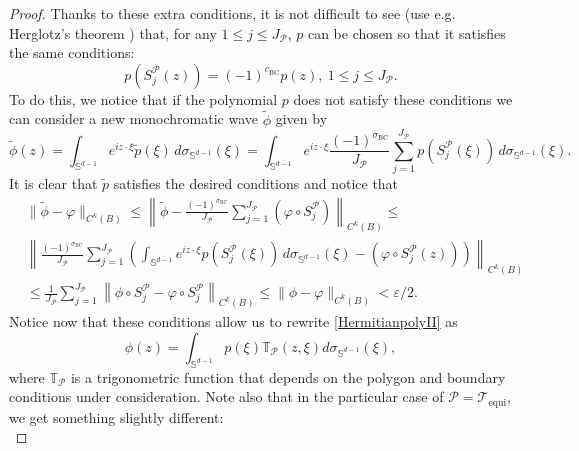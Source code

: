 \documentclass{amsart}
\theoremstyle{definition}
\theoremstyle{remark}
\newcommand{\ep}{\varepsilon}
\newcommand{\si}{\sigma}
\renewcommand\leq\leqslant
\numberwithin{equation}{section}
\theoremstyle{definition}
\theoremstyle{remark}
\begin{document}
\begin{proof}
	Thanks to these extra conditions, it is not difficult to see (use e.g. Herglotz's theorem \cite[Theorem 7.1.27]{Hor}) that, for any $1\leq j\leq J_\mathcal{P}$, $p$ can be chosen so that it satisfies the same conditions:\begin{equation}
		p\left(S^{\mathcal{P}}_j\left(z\right)\right)=\left(-1\right)^{c_\mathrm{BC}}p(z),\ 1\leq j\leq J_\mathcal{P}.
	\end{equation}To do this, we notice that if the polynomial $p$ does not satisfy these conditions we can consider a new monochromatic wave $\tilde{\phi}$ given by\begin{equation}
\tilde{	\phi}(z)=\int_{\mathbb{S}^{d-1}} e^{i z\cdot\xi} \tilde{p}(\xi) \, d\si_{\mathbb{S}^{d-1}}(\xi)=\int_{\mathbb{S}^{d-1}} e^{i z\cdot\xi} \frac{\left(-1\right)^{\sigma_{\mathrm{BC}}}}{J_\mathcal{P}}\sum_{j=1}^{J_\mathcal{P}}p\left(S^\mathcal{P}_j\left(\xi\right)\right) \, d\si_{\mathbb{S}^{d-1}}(\xi).
	\end{equation}It is clear that $\tilde{p}$ satisfies the desired conditions and notice that
	\begin{equation}
	\begin{aligned}
	&\|\tilde{\phi}-\varphi\|_{C^k(B)}\leq\left\|\tilde{\phi}-\frac{\left(-1\right)^{\sigma_{\mathrm{BC}}}}{J_\mathcal{P}}\sum_{j=1}^{J_\mathcal{P}}\left(\varphi\circ S^\mathcal{P}_j\right)\right\|_{C^k(B)}\leq\\&\left\|\frac{\left(-1\right)^{\sigma_{\mathrm{BC}}}}{J_\mathcal{P}}\sum_{j=1}^{J_\mathcal{P}}\left(\int_{\mathbb{S}^{d-1}} e^{i z\cdot\xi} p\left(S^\mathcal{P}_j\left(\xi\right)\right) \, d\si_{\mathbb{S}^{d-1}}(\xi)-\left(\varphi\circ S^\mathcal{P}_j(z)\right)\right)\right\|_{C^k(B)}\\&\leq \frac{1}{J_\mathcal{P}}\sum_{j=1}^{J_\mathcal{P}}\left\|\phi\circ S^\mathcal{P}_j-\varphi\circ S^\mathcal{P}_j\right\|_{C^k(B)}\leq\|\phi-\varphi\|_{C^k(B)}<\ep/2.
	\end{aligned}
	\end{equation}
	Notice now that these conditions allow us to rewrite \eqref{HermitianpolyII} as
	\begin{equation}
		\phi(z)=\int_{\mathbb{S}^{d-1}}p(\xi)\mathbb{T}_\mathcal{P}(z,\xi)d\si_{\mathbb{S}^{d-1}}(\xi),
	\end{equation}where $\mathbb{T}_\mathcal{P}$ is a trigonometric function that depends on the polygon and boundary conditions under consideration. Note also that in the particular case of $\mathcal{P}=	\mathcal{T}_\mathrm{equi}$, we get something slightly different:\begin{equation}

\end{equation}
\end{proof}
\end{document}
